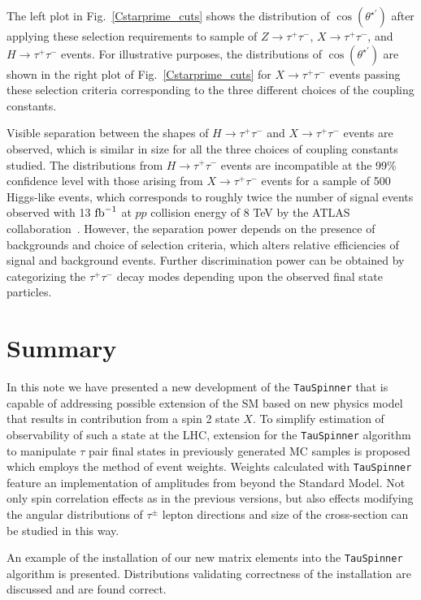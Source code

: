 \documentclass[12pt]{article}
\begin{document}
The left plot in Fig.~\ref{Cstarprime_cuts} shows the distribution of $\cos(\theta^{\star\prime})$ after applying these selection requirements
to sample of $Z\to\tau^+\tau^-$,  $X\to\tau^+\tau^-$, and $H\to\tau^+\tau^-$ events. 
For illustrative purposes, the distributions of $\cos(\theta^{\star\prime})$ are shown in the right plot of Fig.~\ref{Cstarprime_cuts} 
for $X\to\tau^+\tau^-$ events passing these selection criteria corresponding to the three different choices of the coupling constants.

Visible separation between the shapes of $H\to\tau^+\tau^-$ and $X\to\tau^+\tau^-$ events are observed, 
which is similar in size for all the three choices of coupling constants studied.
The distributions from  $H\to\tau^+\tau^-$ events are incompatible at the 99\% confidence level with those arising from $X\to\tau^+\tau^-$ events
for a sample of 500 Higgs-like events, which corresponds to roughly twice the number of signal events 
observed with 13 ${\rm{fb}}^{-1}$ at $pp$ collision energy of 8 TeV by the ATLAS collaboration~\cite{ATLAS_HCP}.
However, the separation power depends on the presence of backgrounds and choice of selection criteria, 
which alters relative efficiencies of signal and background events.
Further discrimination power can be obtained by categorizing the $\tau^+\tau^-$ decay modes 
depending upon the observed final state particles.

\section{Summary}

In this note we have presented a new development of the {\tt  TauSpinner} 
that is capable of addressing possible extension of the SM based on new physics model 
that results in contribution from a spin 2 state $X$. 
To simplify estimation of observability of such a state at the LHC,
extension for the {\tt TauSpinner} algorithm to manipulate $\tau$ pair final states 
in previously generated MC samples is proposed  which employs the method of event weights.
Weights calculated with {\tt TauSpinner}  feature an implementation of amplitudes from beyond the Standard Model.
Not only spin correlation effects as in the previous versions, 
but also effects modifying the angular distributions of $\tau^\pm$ lepton directions 
and size of the cross-section can be studied in this way.

An  example of the installation of our new  matrix elements into the  {\tt TauSpinner} algorithm is presented.
Distributions validating  correctness of the installation are discussed and  are found correct.
\end{document}
